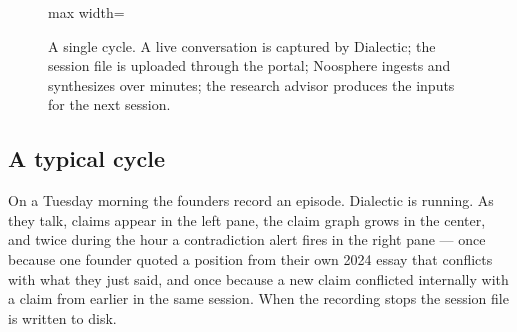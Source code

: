 \documentclass[11pt]{article}
\begin{document}
\begin{figure}[H]
\centering
\begin{adjustbox}{max width=\textwidth}
\end{adjustbox}
\caption{A single cycle. A live conversation is captured by Dialectic; the session file is uploaded through the portal; Noosphere ingests and synthesizes over minutes; the research advisor produces the inputs for the next session.}
\end{figure}

\subsection{A typical cycle}

On a Tuesday morning the founders record an episode. Dialectic is running. As they talk, claims appear in the left pane, the claim graph grows in the center, and twice during the hour a contradiction alert fires in the right pane --- once because one founder quoted a position from their own 2024 essay that conflicts with what they just said, and once because a new claim conflicted internally with a claim from earlier in the same session. When the recording stops the session file is written to disk.
\end{document}
